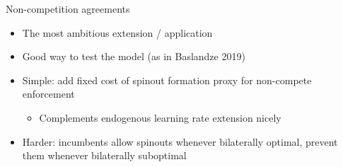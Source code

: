 \documentclass[english,usenames,dvipsnames]{beamer}
\begin{document}
\begin{frame}{Non-competition agreements}
\begin{itemize}
	\item The most ambitious extension / application
	\item Good way to test the model (as in Baslandze 2019)
	\item Simple: add fixed cost of spinout formation proxy for non-compete enforcement
	\begin{itemize}
		\item Complements endogenous learning rate extension nicely
	\end{itemize}
	\item Harder: incumbents allow spinouts whenever bilaterally optimal, prevent them whenever bilaterally suboptimal 
\end{itemize}
\end{frame}

	
	
\end{document}
